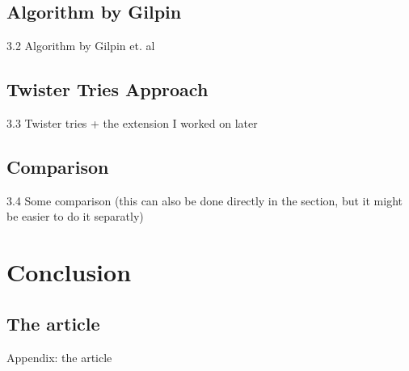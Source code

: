 \documentclass[utf8,english]{gradu3}
\begin{document}
\section{Algorithm by Gilpin}
3.2 Algorithm by Gilpin et. al

\section{Twister Tries Approach}
3.3 Twister tries + the extension I worked on later

\section{Comparison}
3.4 Some comparison (this can also be done directly in the section, but it might be easier to do it separatly)

\chapter{Conclusion}

\printbibliography






\appendix

\section{The article}
Appendix: the article
\end{document}
